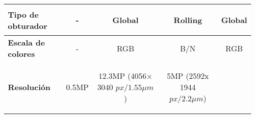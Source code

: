\begin{itemize}
\begin{savenotes}
\begin{mytable}[H]
\begin{tabular}{l|c|c|c|c|}
{\begin{minipage}{\myforthmaxsizeofcontenttable}
						\textbf{Tipo de obturador}
					\end{minipage}
				} & 
				\begin{minipage}{\mythirdmaxsizeofcontenttable}\begin{myflushcenter}
						- 
				\end{myflushcenter}\end{minipage} & 
				\begin{minipage}{\mythirdmaxsizeofcontenttable}\begin{myflushcenter}
						Global
				\end{myflushcenter}\end{minipage} &
				\begin{minipage}{\mythirdmaxsizeofcontenttable}\begin{myflushcenter}
						Rolling 
				\end{myflushcenter}\end{minipage}&
				\begin{minipage}{\mythirdmaxsizeofcontenttable}\begin{myflushcenter}
					Global 
				\end{myflushcenter}\end{minipage} 			
				\\ \hline
				\multicolumn{1}{|l|}{
					\begin{minipage}{\myforthmaxsizeofcontenttable}	
						\textbf{Escala de colores}
					\end{minipage}
				} & - & RGB & B/N & RGB \\ \hline
				\multicolumn{1}{|l|}{
				\begin{minipage}{\myforthmaxsizeofcontenttable}	
					\textbf{Resolución}
				\end{minipage}
				} & 0.5MP & 
				\begin{minipage}{\mythirdmaxsizeofcontenttable}\begin{myflushcenter}
					12.3MP (4056× 3040 $px/1.55{\mu}m$)
				\end{myflushcenter}\end{minipage} & 
				\begin{minipage}{\mythirdmaxsizeofcontenttable}\begin{myflushcenter}
					5MP (2592x 1944 $px/2.2{\mu}m$)

\end{myflushcenter}
\end{minipage}
\end{tabular}
\end{mytable}
\end{savenotes}
\end{itemize}
